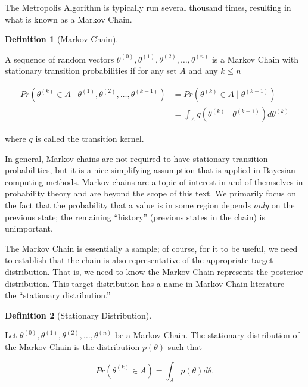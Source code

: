 \documentclass[
  letterpaper,
  DIV=11,
  numbers=noendperiod]{scrreprt}
\theoremstyle{definition}
\theoremstyle{definition}
\newtheorem{definition}{Definition}[chapter]
\theoremstyle{plain}
\theoremstyle{remark}
\begin{document}
The Metropolis Algorithm is typically run several thousand times,
resulting in what is known as a Markov Chain.

\begin{definition}[Markov
Chain]\protect\hypertarget{def-markov-chain}{}\label{def-markov-chain}

A sequence of random vectors
\(\theta^{(0)}, \theta^{(1)}, \theta^{(2)}, \dotsc, \theta^{(n)}\) is a
Markov Chain with stationary transition probabilities if for any set
\(A\) and any \(k \leq n\)

\[
\begin{aligned}
  Pr\left(\theta^{(k)} \in A \mid \theta^{(1)}, \theta^{(2)}, \dotsc, \theta^{(k-1)}\right)
    &= Pr\left(\theta^{(k)} \in A \mid \theta^{(k-1)}\right) \\
    &= \int_{A} q\left(\theta^{(k)} \mid \theta^{(k-1)}\right) d\theta^{(k)}
\end{aligned}
\]

where \(q\) is called the transition kernel.

\end{definition}

In general, Markov chains are not required to have stationary transition
probabilities, but it is a nice simplifying assumption that is applied
in Bayesian computing methods. Markov chains are a topic of interest in
and of themselves in probability theory and are beyond the scope of this
text. We primarily focus on the fact that the probability that a value
is in some region depends \emph{only} on the previous state; the
remaining ``history'' (previous states in the chain) is unimportant.

The Markov Chain is essentially a sample; of course, for it to be
useful, we need to establish that the chain is also representative of
the appropriate target distribution. That is, we need to know the Markov
Chain represents the posterior distribution. This target distribution
has a name in Markov Chain literature --- the ``stationary
distribution.''

\begin{definition}[Stationary
Distribution]\protect\hypertarget{def-stationary-distribution}{}\label{def-stationary-distribution}

Let \(\theta^{(0)}, \theta^{(1)}, \theta^{(2)}, \dotsc, \theta^{(n)}\)
be a Markov Chain. The stationary distribution of the Markov Chain is
the distribution \(p(\theta)\) such that

\[Pr\left(\theta^{(k)} \in A\right) = \int_{A} p(\theta) d\theta.\]

\end{definition}
\end{document}
